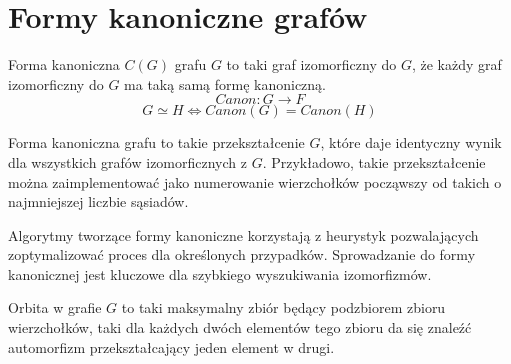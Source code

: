   \section{Formy kanoniczne grafów}

  \begin{definition}
    Forma kanoniczna $C(G)$ grafu $G$ to taki graf izomorficzny do $G$, że każdy graf izomorficzny do $G$ ma taką samą formę kanoniczną\cite{canon}. 
    $$ Canon \colon G \to F$$
    $$G \simeq H \iff Canon(G) = Canon(H) $$
  \end{definition}

  Forma kanoniczna grafu to takie przekształcenie $G$, 
  które daje identyczny wynik dla wszystkich grafów izomorficznych z $G$. Przykładowo, takie przekształcenie można zaimplementować
   jako numerowanie wierzchołków począwszy od takich o najmniejszej liczbie sąsiadów. 


  
Algorytmy tworzące formy kanoniczne korzystają z  heurystyk pozwalających zoptymalizować proces dla określonych przypadków\cite{canon}.  Sprowadzanie do formy kanonicznej jest kluczowe dla szybkiego wyszukiwania izomorfizmów.
%
 

\begin{definition}[Orbita]
  Orbita w grafie $G$ to taki maksymalny zbiór będący podzbiorem zbioru wierzchołków, taki dla każdych dwóch elementów tego zbioru da się znaleźć automorfizm przekształcający jeden element w drugi.
\end{definition}

